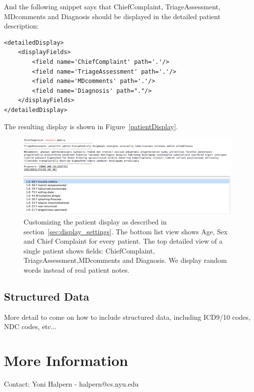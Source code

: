 \documentclass[12pt]{article}
\begin{document}
And the following snippet says that ChiefComplaint, TriageAssessment, MDcomments and Diagnosis should be displayed in the detailed patient description:

\begin{verbatim}
<detailedDisplay>
    <displayFields>
        <field name='ChiefComplaint' path='.'/>
        <field name='TriageAssessment' path='.'/>
        <field name='MDcomments' path='.'/>
        <field name='Diagnosis' path="."/>
    </displayFields>
</detailedDisplay>
\end{verbatim}

The resulting display is shown in Figure~\ref{patientDisplay}.
\begin{figure}[ht]
	\begin{center}
		\includegraphics[scale=0.5]{patientDisplayScreenshot}
	\end{center}
	\caption{\label{patientDisplay} Customizing the patient display as described in section~\ref{sec:display_settings}. The bottom list view shows Age, Sex and Chief Complaint for every patient. The top detailed view of a single patient shows fields: ChiefComplaint, TriageAssessment,MDcomments and Diagnosis. We display random words instead of real patient notes.}
	\label{fig:figure1}
\end{figure}

\subsection{Structured Data}
More detail to come on how to include structured data, including ICD9/10 codes, NDC codes, etc...

\section{More Information}
Contact: Yoni Halpern - halpern@cs.nyu.edu
\end{document}
